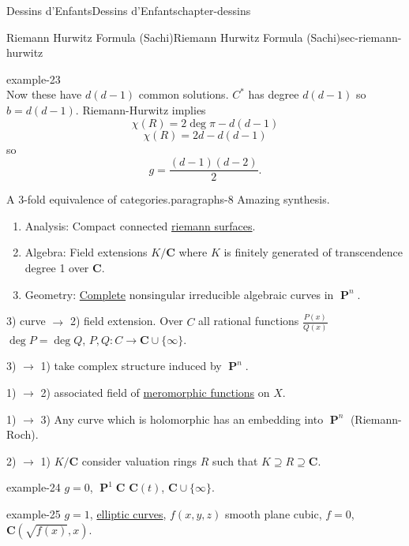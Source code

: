 \documentclass[oneside,10pt,]{book}
\numberwithin{equation}{section}
\newcommand{\CC}{\mathbf{C}}
\DeclareMathOperator{\PP}{\mathbf{P}}
\begin{document}
\begin{chapterptx}{Dessins d'Enfants}{}{Dessins d'Enfants}{}{}{chapter-dessins}
\begin{sectionptx}{Riemann Hurwitz Formula (Sachi)}{}{Riemann Hurwitz Formula (Sachi)}{}{}{sec-riemann-hurwitz}
\begin{example}{}{example-23}
\begin{equation*}
\end{equation*}
Now these have \(d(d-1)\) common solutions. \(C^*\) has degree \(d(d-1)\) so \(b = d(d-1)\). Riemann-Hurwitz implies%
\begin{equation*}
\chi(R) = 2\deg \pi - d(d-1)
\end{equation*}
%
\begin{equation*}
\chi(R) = 2d - d(d-1)
\end{equation*}
so%
\begin{equation*}
g=  \frac{(d-1)(d-2)}{2}\text{.}
\end{equation*}
%
\end{example}
\begin{paragraphs}{A 3-fold equivalence of categories.}{paragraphs-8}%
\hypertarget{p-523}{}%
Amazing synthesis.\leavevmode%
\begin{enumerate}
\item\hypertarget{li-103}{}Analysis: Compact connected \hyperref[def-top-riem-surface]{riemann surfaces}.%
\item\hypertarget{li-104}{}Algebra: Field extensions \(K/\CC\) where \(K\) is finitely generated of transcendence degree 1 over \(\CC\).%
\item\hypertarget{li-105}{}Geometry: \hyperref[def-abelian-complete-var]{Complete} nonsingular irreducible algebraic curves in \(\PP^n\).%
\end{enumerate}
%
\par
\hypertarget{p-524}{}%
3) curve \(\to\) 2) field extension. Over \(C\) all rational functions \(\frac{P(x)}{Q(x)}\) \(\deg P= \deg Q\), \(P,Q \colon C\to \CC \cup \{\infty\}\).%
\par
\hypertarget{p-525}{}%
3) \(\to\) 1) take complex structure induced by \(\PP^n\).%
\par
\hypertarget{p-526}{}%
1) \(\to\) 2) associated field of \hyperref[def-morph-riem-surf]{meromorphic functions} on \(X\).%
\par
\hypertarget{p-527}{}%
1) \(\to\) 3) Any curve which is holomorphic has an embedding into \(\PP^n\) (Riemann-Roch).%
\par
\hypertarget{p-528}{}%
2) \(\to\) 1) \(K/\CC\) consider valuation rings \(R\) such that \(K\supseteq R\supseteq \CC\).%
\begin{example}{}{example-24}%
\hypertarget{p-529}{}%
\(g =0\), \(\PP^1 \CC\) \(\CC(t)\), \(\CC\cup \{\infty\}\).%
\end{example}
\begin{example}{}{example-25}%
\hypertarget{p-530}{}%
\(g =1\), \hyperref[def-supersing-isog-ec]{elliptic curves}, \(f(x,y,z)\) smooth plane cubic, \(f= 0\), \(\CC(\sqrt{f(x)}, x)\).%

\end{example}
\end{paragraphs}
\end{sectionptx}
\end{chapterptx}
\end{document}
